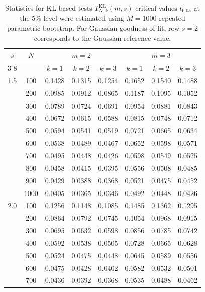 \documentclass[12pt,a4paper]{article}
\theoremstyle{definition}
\theoremstyle{plain}
\begin{document}
{\begin{table}[htbp]
\centering
\small
\renewcommand\arraystretch{1.25}
\caption{Statistics for KL-based tests $T_{N,k}^{\mathrm{KL}}(m,s)$ critical values $t_{0.05}$ at the 5\% level were estimated using $M=1000$ repeated parametric bootstrap. For Gaussian goodness-of-fit, row $s=2$ corresponds to the Gaussian reference value.}
\label{table:crt_val_KL}
\begin{tabular*}{\textwidth}{@{\extracolsep{\fill}} cc | ccc | ccc }
\hline
\multirow{2}{*}{$s$} & \multirow{2}{*}{$N$} & \multicolumn{3}{c|}{$m=2$} & \multicolumn{3}{c}{$m=3$} \\
\cline{3-8}
 & & $k=1$ & $k=2$ & $k=3$ & $k=1$ & $k=2$ & $k=3$ \\
\hline
1.5 & 100  & 0.1428 & 0.1315 & 0.1254 & 0.1652 & 0.1540 & 0.1488 \\
    & 200  & 0.0985 & 0.0912 & 0.0865 & 0.1187 & 0.1095 & 0.1052 \\
    & 300  & 0.0789 & 0.0724 & 0.0691 & 0.0954 & 0.0881 & 0.0843 \\
    & 400  & 0.0672 & 0.0615 & 0.0588 & 0.0815 & 0.0748 & 0.0712 \\
    & 500  & 0.0594 & 0.0541 & 0.0519 & 0.0721 & 0.0665 & 0.0634 \\
    & 600  & 0.0538 & 0.0489 & 0.0467 & 0.0652 & 0.0598 & 0.0571 \\
    & 700  & 0.0495 & 0.0448 & 0.0426 & 0.0598 & 0.0549 & 0.0525 \\
    & 800  & 0.0458 & 0.0415 & 0.0395 & 0.0556 & 0.0508 & 0.0485 \\
    & 900  & 0.0429 & 0.0388 & 0.0368 & 0.0521 & 0.0475 & 0.0452 \\
    & 1000 & 0.0405 & 0.0365 & 0.0346 & 0.0492 & 0.0448 & 0.0426 \\
\hline
2.0 & 100  & 0.1256 & 0.1148 & 0.1085 & 0.1485 & 0.1362 & 0.1295 \\
    & 200  & 0.0864 & 0.0792 & 0.0745 & 0.1054 & 0.0968 & 0.0915 \\
    & 300  & 0.0695 & 0.0632 & 0.0598 & 0.0856 & 0.0785 & 0.0742 \\
    & 400  & 0.0592 & 0.0538 & 0.0505 & 0.0728 & 0.0665 & 0.0628 \\
    & 500  & 0.0524 & 0.0475 & 0.0448 & 0.0645 & 0.0589 & 0.0556 \\
    & 600  & 0.0475 & 0.0428 & 0.0402 & 0.0582 & 0.0532 & 0.0501 \\
    & 700  & 0.0436 & 0.0392 & 0.0368 & 0.0535 & 0.0488 & 0.0462 \\

\end{tabular*}
\end{table}}
\end{document}

